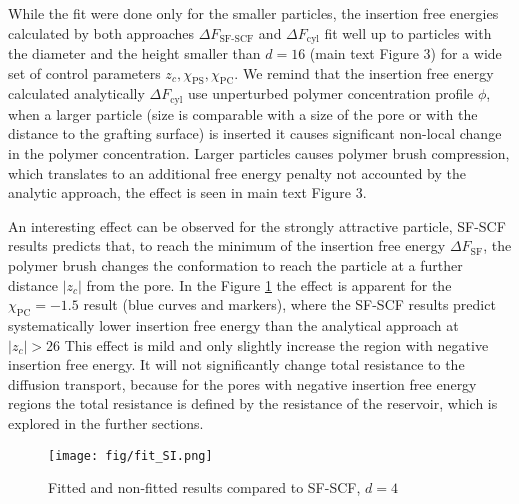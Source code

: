 \documentclass[10pt, a4paper]{article}
\begin{document}
\begin{multicols}{2}
While the fit were done only for the smaller particles, the insertion free energies calculated by both approaches $\Delta F_{\textrm{SF-SCF}}$ and $\Delta F_{\textrm{cyl}}$ fit well up to particles with the diameter and the height smaller than $d=16$ (main text Figure 3) for a wide set of control parameters $z_c, \chi_{\textrm{PS}}, \chi_{\textrm{PC}}$.
We remind that the insertion free energy calculated analytically $\Delta F_{\textrm{cyl}}$ use unperturbed polymer concentration profile $\phi$, when a larger particle (size is comparable with a size of the pore or with the distance to the grafting surface) is inserted it causes significant non-local change in the polymer concentration. 
Larger particles causes polymer brush compression, which translates to an additional free energy penalty not accounted by the analytic approach, the effect is seen in main text Figure 3.



An interesting effect can be observed for the strongly attractive particle, SF-SCF results predicts that, to reach the minimum of the insertion free energy $\Delta F_{\textrm{SF}}$, the polymer brush changes the conformation to reach the particle at a further distance $|z_c|$ from the pore.
In the Figure \ref{fig:fit_SI} the effect is apparent for the $\chi_{\textrm{PC}} =-1.5$ result (blue curves and markers), where the SF-SCF results predict systematically lower insertion free energy than the analytical approach at $|z_c| > 26$
This effect is mild and only slightly increase the region with negative insertion free energy.
It will not significantly change total resistance to the diffusion transport, because for the pores with negative insertion free energy regions the total resistance is defined by the resistance of the reservoir, which is explored in the further sections.

\begin{figure}[H]
    \centering
    \texttt{[image: fig/fit\_SI.png]}
    \caption{Fitted and non-fitted results compared to SF-SCF, $d=4$}
    \label{fig:fit_SI}
\end{figure}

\end{multicols}

\end{document}
